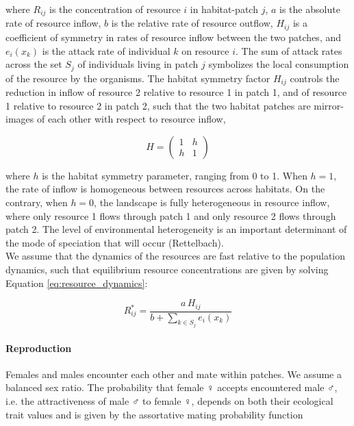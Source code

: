 where $R_{ij}$ is the concentration of resource $i$ in habitat-patch $j$, $a$ is the absolute rate of resource inflow, $b$ is the relative rate of resource outflow, $H_{ij}$ is a coefficient of symmetry in rates of resource inflow between the two patches, and $e_i(x_k)$ is the attack rate of individual $k$ on resource $i$. The sum of attack rates across the set $S_j$ of individuals living in patch $j$ symbolizes the local consumption of the resource by the organisms. The habitat symmetry factor $H_{ij}$ controls the reduction in inflow of resource 2 relative to resource 1 in patch 1, and of resource 1 relative to resource 2 in patch 2, such that the two habitat patches are mirror-images of each other with respect to resource inflow,

\begin{equation}
    H = 
    \begin{pmatrix} 
        1 & h \\ 
        h & 1
    \end{pmatrix}
\end{equation}

where $h$ is the habitat symmetry parameter, ranging from 0 to 1. When $h = 1$, the rate of inflow is homogeneous between resources across habitats. On the contrary, when $h = 0$, the landscape is fully heterogeneous in resource inflow, where only resource 1 flows through patch 1 and only resource 2 flows through patch 2. The level of environmental heterogeneity is an important determinant of the mode of speciation that will occur (Rettelbach).\\

We assume that the dynamics of the resources are fast relative to the population dynamics, such that equilibrium resource concentrations are given by solving Equation \ref{eq:resource_dynamics}:

\begin{equation}
    R^*_{ij} = \frac{a \, H_{ij}}{b + \sum_{k \in S_j} e_i(x_k)}
\end{equation}

\paragraph{Reproduction} Females and males encounter each other and mate within patches. We assume a balanced sex ratio. The probability that female $\female$ accepts encountered male $\male$, i.e. the attractiveness of male $\male$ to female $\female$, depends on both their ecological trait values and is given by the assortative mating probability function

